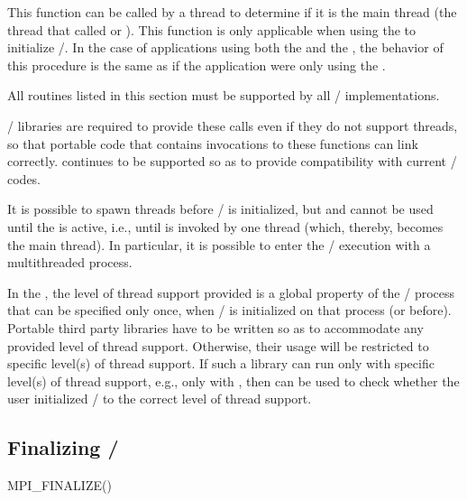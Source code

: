 This function can be called by a thread to determine if it is the
main thread (the thread that called  or
).  This function is only applicable when using the \wpm{} to
initialize \MPI/.  In the case of applications using both the \wpm{}
and the \spm{}, the behavior of this procedure is the same as if the application were only using the \wpm{}.

All routines listed in this section
must be
supported by all \MPI/ implementations.

\begin{rationale}
\MPI/ libraries are required to provide these calls even if they do
not support threads, so that portable code that contains invocations
to these functions can link correctly.  
continues to be
supported so as to provide compatibility with current \MPI/ codes.
\end{rationale}

\begin{users}
It is possible to spawn threads before \MPI/ is initialized, but
  and  cannot be used until the \wpm{} is active,
i.e., until  is invoked by one
thread (which, thereby, becomes the  main thread).  In particular, it is
possible to enter the \MPI/ execution with a multithreaded process.

In the \wpm{}, the level of thread support provided is a global property of the \MPI/
process that can be specified only once, when \MPI/ is initialized on
that process (or before).   Portable third party libraries have to be written so as to
accommodate any provided level of thread support.
Otherwise, their usage will be restricted to specific level(s) of thread support.
If such a library can run only with specific level(s) of thread support, e.g.,
only with , then
 can be used to check whether the
user initialized \MPI/ to the correct level of thread support.
\end{users}

\subsection{Finalizing \texorpdfstring{\mpi/}{MPI}}
\label{sec:inquiry-finalize}

\begin{funcdefna}{MPI\_FINALIZE}{()}
\end{funcdefna}

